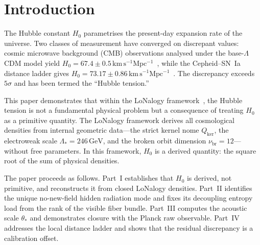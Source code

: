 \documentclass[12pt]{article}
\theoremstyle{plain}
\theoremstyle{definition}
\numberwithin{equation}{section}
\newcommand{\br}{\mathrm{br}}
\newcommand{\kker}{\mathrm{ker}}
\newcommand{\eff}{\mathrm{eff}}
\begin{document}
\begin{titlepage}
\begin{abstract}
The $5.8\%$ shift from the base-$\Lambda$CDM baseline is shown to originate
not from the dark-energy equation of state ($w+1\sim Q_{\kker}^2\sim 10^{-6}$)
but from the absolute vacuum amplitude $\Lambda_{\eff}=\Lambda_*^4 Q_{\kker}^{20}$,
which exceeds the PDG 2025 value by $17\%$.
The residual $3.4\%$ discrepancy with the SH0ES value corresponds to a
$0.074\,\mathrm{mag}$ calibration offset in the Cepheid--SN~Ia distance
ladder, not a contradiction in background expansion.
\end{abstract}
\end{titlepage}

\setcounter{page}{1}
\tableofcontents
\newpage


\section*{Introduction}

The Hubble constant $H_0$ parametrises the present-day expansion rate of
the universe.  Two classes of measurement have converged on discrepant values:
cosmic microwave background (CMB) observations analysed under the base-$\Lambda$CDM
model yield $H_0=67.4\pm0.5\,\mathrm{km\,s^{-1}Mpc^{-1}}$~\cite{Planck2018},
while the Cepheid--SN~Ia distance ladder gives
$H_0=73.17\pm0.86\,\mathrm{km\,s^{-1}Mpc^{-1}}$~\cite{SH0ES2022,Breuval2024}.
The discrepancy exceeds $5\sigma$ and has been termed the ``Hubble tension.''

This paper demonstrates that within the LoNalogy framework~\cite{LoNalogyv87,YMmassGap,ParticleCosmo},
the Hubble tension is not a fundamental physical problem but a consequence of
treating $H_0$ as a primitive quantity.  The LoNalogy framework derives all
cosmological densities from internal geometric data---the strict kernel nome
$Q_{\kker}$, the electroweak scale $\Lambda_*=246\,\mathrm{GeV}$, and the
broken orbit dimension $\nu_{\br}=12$---without free parameters.  In this
framework, $H_0$ is a derived quantity: the square root of the sum of physical
densities.

The paper proceeds as follows.  Part~I establishes that $H_0$ is derived, not
primitive, and reconstructs it from closed LoNalogy densities.  Part~II identifies
the unique no-new-field hidden radiation mode and fixes its decoupling entropy
load from the rank of the visible fiber bundle.  Part~III computes the acoustic
scale $\theta_*$ and demonstrates closure with the Planck raw observable.
Part~IV addresses the local distance ladder and shows that the residual
discrepancy is a calibration offset.
\end{document}
